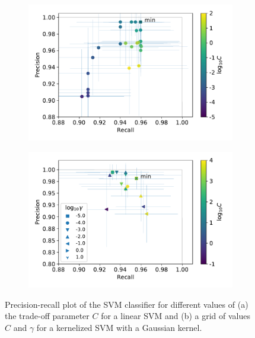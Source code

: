 \documentclass[12pt, a4paper]{scrartcl}
\begin{document}
\begin{figure}
	\centering
	 \begin{subfigure}[b]{0.45\textwidth}
	 	\includegraphics[width=\textwidth]{svm}
	 	\caption{}
	 	\label{fig:svm1}
    \end{subfigure}
	 \begin{subfigure}[b]{0.45\textwidth}
	 	\includegraphics[width=\textwidth]{svm_grid}
	 	\caption{}
	 	\label{fig:svm2}
    \end{subfigure}
	\caption{Precision-recall plot of the SVM classifier for different values of (a) the trade-off parameter $C$ for a linear SVM and (b) a grid of values $C$ and $\gamma$ for a kernelized SVM with a Gaussian kernel.}
	\label{fig:svm}
\end{figure}
\end{document}
